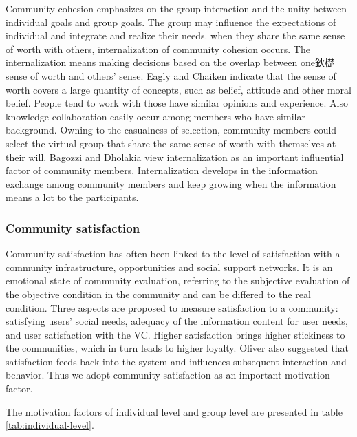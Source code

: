 \documentclass[doublespacing]{elsarticle}
\begin{document}
Community cohesion emphasizes on the group interaction and the
unity between individual goals and group goals. The group may influence
the expectations of individual and  integrate and realize their
needs. when they share the same sense of
worth with others, internalization of community cohesion occurs.
 The
internalization means making decisions based on the overlap between
one鈥檚 sense of worth and others' sense. Eagly and Chaiken indicate that the
sense of worth covers a large quantity of concepts, such as belief,
attitude and other moral belief\cite{eagly1993pa}. People tend to work
with those have similar opinions and experience. Also knowledge
collaboration  easily occur among members who have similar background.  Owning to the casualness of selection,
community members could select the virtual group that share
the same sense of worth with themselves at their will. Bagozzi and Dholakia
view internalization as an important influential factor of community
members\cite{richard_p._bagozzi_intentional_2002}. Internalization develops in the information exchange among
community members and keep growing when the information means a lot to
the participants. 

\subsubsection{Community satisfaction}
\label{sec:comm-satisf}

Community satisfaction has often been linked to the level of satisfaction with a
community infrastructure,  opportunities and social support networks\cite{filkins2000predicting}. It is an emotional state of community
evaluation, referring to the
subjective evaluation of the objective condition in the community and
can be differed to the real condition. Three aspects are proposed to
measure satisfaction to a community: satisfying users' social needs, adequacy of the information content for
user needs, and user satisfaction with the VC\cite{lin2006determinants}. Higher satisfaction brings
higher stickiness to the communities, which in turn leads to higher
loyalty\cite{linhsiufen2008}. Oliver also suggested that satisfaction
feeds back into the system and influences subsequent interaction and
behavior\cite{oliver1980cognitive}. Thus we adopt community
satisfaction as an important motivation factor.

The motivation factors of  individual level and group level are
presented in table \ref{tab:individual-level}.
\end{document}
